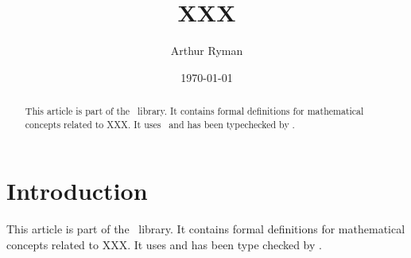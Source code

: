 \documentclass{amsart}
\begin{document}
\title{XXX}
\author{Arthur Ryman}
\date{\today}

\begin{abstract}
    This article is part of the \mathz\ library.
    It contains formal definitions for mathematical concepts related to XXX.
    It uses \ZN\ and has been typechecked by \fuzz.
\end{abstract}

\maketitle

\tableofcontents

\section{Introduction}

This article is part of the \mathz\ library.
It contains formal definitions for mathematical concepts related to XXX.
It uses \ZN\cite{spivey-zrm} and has been type checked by \fuzz\cite{spivey-fm}.

\printbibliography
\end{document}
